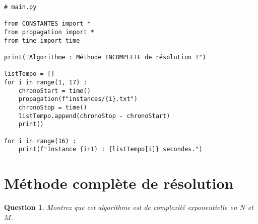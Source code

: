 \documentclass[a4paper,12pt]{article}
\newtheorem{exo}{Question}
\begin{document}
\begin{lstlisting}
# main.py

from CONSTANTES import *
from propagation import *
from time import time

print("Algorithme : Méthode INCOMPLETE de résolution !")

listTempo = []
for i in range(1, 17) :
    chronoStart = time()
    propagation(f"instances/{i}.txt")
    chronoStop = time()
    listTempo.append(chronoStop - chronoStart)
    print()
    
for i in range(16) :
    print(f"Instance {i+1} : {listTempo[i]} secondes.")
\end{lstlisting}



\section{Méthode complète de résolution}


\begin{exo}
	Montrez que cet algorithme est de complexité exponentielle en $N$ et $M$.
\end{exo}
\end{document}
